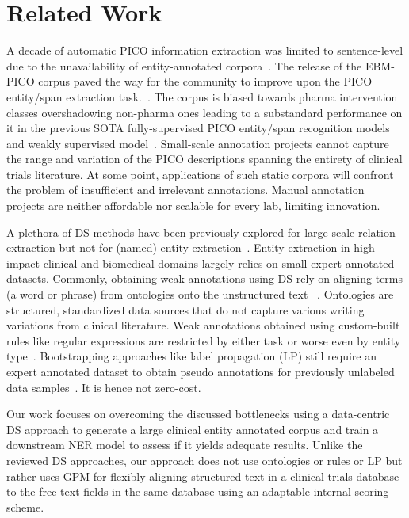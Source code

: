 \documentclass[11pt]{article}
\begin{document}
\section{Related Work}
\label{sec:relworks}
%
A decade of automatic PICO information extraction was limited to sentence-level due to the unavailability of entity-annotated corpora~\citep{boudin2010combining, huang2011classification, huang2013pico, wallace2016extracting, jin2018pico}.
The release of the EBM-PICO corpus paved the way for the community to improve upon the PICO entity/span extraction task.~\citep{nye2018corpus}.
The corpus is biased towards pharma intervention classes overshadowing non-pharma ones leading to a substandard performance on it in the previous SOTA fully-supervised PICO entity/span recognition models~\citep{beltagy2019scibert,brockmeier2019improving,zhang2020unlocking} and weakly supervised model~\citep{liu2021sent2span}.
Small-scale annotation projects cannot capture the range and variation of the PICO descriptions spanning the entirety of clinical trials literature.
At some point, applications of such static corpora will confront the problem of insufficient and irrelevant annotations.
Manual annotation projects are neither affordable nor scalable for every lab, limiting innovation.

A plethora of DS methods have been previously explored for large-scale relation extraction but not for (named) entity extraction~\cite{etzioni2008open,smirnova2018relation,adelani2020distant}.
Entity extraction in high-impact clinical and biomedical domains largely relies on small expert annotated datasets.
Commonly, obtaining weak annotations using DS rely on aligning terms (a word or phrase) from ontologies onto the unstructured text ~\citep{giannakopoulos2017unsupervised,yang2018distantly,peng2019distantly,hedderich2021anea}.
Ontologies are structured, standardized data sources that do not capture various writing variations from clinical literature.
Weak annotations obtained using custom-built rules like regular expressions are restricted by either task or worse even by entity type~\cite{ratner2017snorkel,safranchik2020weakly,fries2021ontology}.
Bootstrapping approaches like label propagation (LP) still require an expert annotated dataset to obtain pseudo annotations for previously unlabeled data samples~\cite{bing2017bootstrapping}.
It is hence not zero-cost.

Our work focuses on overcoming the discussed bottlenecks using a data-centric DS approach to generate a large clinical entity annotated corpus and train a downstream NER model to assess if it yields adequate results.
Unlike the reviewed DS approaches, our approach does not use ontologies or rules or LP but rather uses GPM for flexibly aligning structured text in a clinical trials database to the free-text fields in the same database using an adaptable internal scoring scheme.
%
%
%
\end{document}
